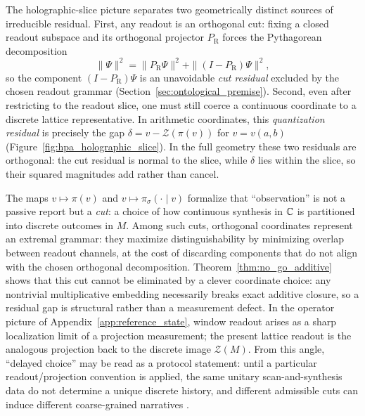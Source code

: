 \begin{remark}
The holographic-slice picture separates two geometrically distinct sources of irreducible residual.
First, any readout is an orthogonal cut: fixing a closed readout subspace and its orthogonal projector $P_{\mathrm{R}}$ forces the Pythagorean decomposition
$$
\|\Psi\|^2=\|P_{\mathrm{R}}\Psi\|^2+\|(I-P_{\mathrm{R}})\Psi\|^2,
$$
so the component $(I-P_{\mathrm{R}})\Psi$ is an unavoidable \emph{cut residual} excluded by the chosen readout grammar (Section~\ref{sec:ontological_premise}).
Second, even after restricting to the readout slice, one must still coerce a continuous coordinate to a discrete lattice representative.
In arithmetic coordinates, this \emph{quantization residual} is precisely the gap
$
\delta=v-\mathcal{Z}(\pi(v))
$
for $v=v(a,b)$ (Figure~\ref{fig:hpa_holographic_slice}).
In the full geometry these two residuals are orthogonal: the cut residual is normal to the slice, while $\delta$ lies within the slice, so their squared magnitudes add rather than cancel.
\end{remark}

\begin{remark}
\label{rem:observation_cut}
The maps $v\mapsto \pi(v)$ and $v\mapsto \pi_\sigma(\cdot\mid v)$ formalize that ``observation'' is not a passive report but a \emph{cut}: a choice of how continuous synthesis in $\mathbb{C}$ is partitioned into discrete outcomes in $M$.
Among such cuts, orthogonal coordinates represent an extremal grammar: they maximize distinguishability by minimizing overlap between readout channels, at the cost of discarding components that do not align with the chosen orthogonal decomposition.
Theorem~\ref{thm:no_go_additive} shows that this cut cannot be eliminated by a clever coordinate choice: any nontrivial multiplicative embedding necessarily breaks exact additive closure, so a residual gap is structural rather than a measurement defect.
In the operator picture of Appendix~\ref{app:reference_state}, window readout arises as a sharp localization limit of a projection measurement; the present lattice readout is the analogous projection back to the discrete image $\mathcal{Z}(M)$.
From this angle, ``delayed choice'' may be read as a protocol statement: until a particular readout/projection convention is applied, the same unitary scan-and-synthesis data do not determine a unique discrete history, and different admissible cuts can induce different coarse-grained narratives \cite{WheelerZurek1983}.
\end{remark}

